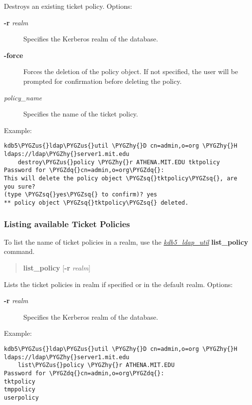 \documentclass[letterpaper,10pt,english]{sphinxmanual}
\def\PYGZus{\char`\_}
\def\PYGZhy{\char`\-}
\def\PYGZsq{\char`\'}
\def\PYGZdq{\char`\"}
\begin{document}
Destroys an existing ticket policy.  Options:
\begin{description}
\item[{\textbf{-r} \emph{realm}}] \leavevmode
Specifies the Kerberos realm of the database.

\item[{\textbf{-force}}] \leavevmode
Forces the deletion of the policy object.  If not specified, the
user will be prompted for confirmation before deleting the policy.

\item[{\emph{policy\_name}}] \leavevmode
Specifies the name of the ticket policy.

\end{description}

Example:

\begin{Verbatim}[commandchars=\\\{\}]
kdb5\PYGZus{}ldap\PYGZus{}util \PYGZhy{}D cn=admin,o=org \PYGZhy{}H ldaps://ldap\PYGZhy{}server1.mit.edu
    destroy\PYGZus{}policy \PYGZhy{}r ATHENA.MIT.EDU tktpolicy
Password for \PYGZdq{}cn=admin,o=org\PYGZdq{}:
This will delete the policy object \PYGZsq{}tktpolicy\PYGZsq{}, are you sure?
(type \PYGZsq{}yes\PYGZsq{} to confirm)? yes
** policy object \PYGZsq{}tktpolicy\PYGZsq{} deleted.
\end{Verbatim}


\subsubsection{Listing available Ticket Policies}
\label{admin/database:listing-available-ticket-policies}
To list the name of ticket policies in a realm, use the
{\hyperref[admin/admin_commands/kdb5_ldap_util:kdb5-ldap-util-8]{\emph{kdb5\_ldap\_util}}} \textbf{list\_policy} command.
\begin{quote}

\textbf{list\_policy}
{[}\textbf{-r} \emph{realm}{]}
\end{quote}

Lists the ticket policies in realm if specified or in the default
realm.  Options:
\begin{description}
\item[{\textbf{-r} \emph{realm}}] \leavevmode
Specifies the Kerberos realm of the database.

\end{description}

Example:

\begin{Verbatim}[commandchars=\\\{\}]
kdb5\PYGZus{}ldap\PYGZus{}util \PYGZhy{}D cn=admin,o=org \PYGZhy{}H ldaps://ldap\PYGZhy{}server1.mit.edu
    list\PYGZus{}policy \PYGZhy{}r ATHENA.MIT.EDU
Password for \PYGZdq{}cn=admin,o=org\PYGZdq{}:
tktpolicy
tmppolicy
userpolicy
\end{Verbatim}
\end{document}
